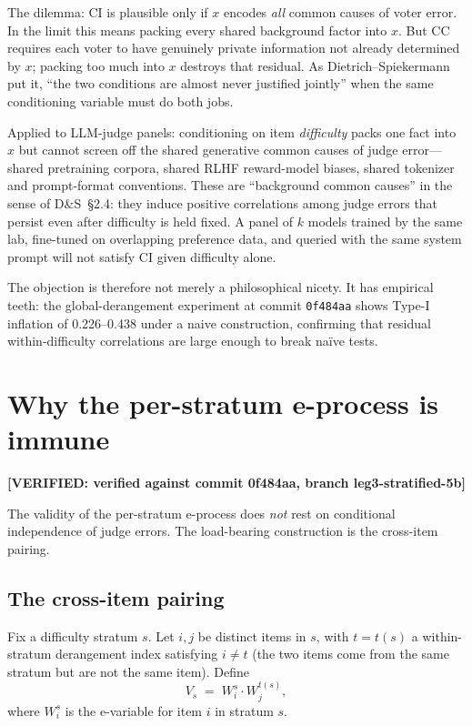 \documentclass[11pt,a4paper]{article}
\newcommand{\verified}[1]{\textbf{[VERIFIED: #1]}}
\begin{document}
The dilemma: CI is plausible only if $x$ encodes \emph{all} common
causes of voter error.  In the limit this means packing every shared
background factor into $x$.  But CC requires each voter to have
genuinely private information not already determined by $x$; packing
too much into $x$ destroys that residual.  As Dietrich--Spiekermann
put it, ``the two conditions are almost never justified jointly''
when the same conditioning variable must do both jobs.

Applied to LLM-judge panels: conditioning on item \emph{difficulty}
packs one fact into $x$ but cannot screen off the shared generative
common causes of judge error---shared pretraining corpora, shared RLHF
reward-model biases, shared tokenizer and prompt-format conventions.
These are ``background common causes'' in the sense of D\&S~\S2.4:
they induce positive correlations among judge errors that persist even
after difficulty is held fixed.  A panel of $k$ models trained by the
same lab, fine-tuned on overlapping preference data, and queried with
the same system prompt will not satisfy CI given difficulty alone.

The objection is therefore not merely a philosophical nicety.  It has
empirical teeth: the global-derangement experiment at commit
\texttt{0f484aa} shows Type-I inflation of 0.226--0.438 under a naive
construction, confirming that residual within-difficulty correlations
are large enough to break na\"ive tests.

\section{Why the per-stratum e-process is immune}

\verified{verified against commit 0f484aa, branch leg3-stratified-5b}

The validity of the per-stratum e-process does \emph{not} rest on
conditional independence of judge errors.  The load-bearing
construction is the cross-item pairing.

\subsection{The cross-item pairing}

Fix a difficulty stratum $s$.  Let $i, j$ be distinct items in $s$,
with $t = t(s)$ a within-stratum derangement index satisfying $i \ne t$
(the two items come from the same stratum but are not the same item).
Define
\[
  V_s \;=\; W_i^s \cdot W_j^{t(s)},
\]
where $W_i^s$ is the e-variable for item $i$ in stratum $s$.
\end{document}
